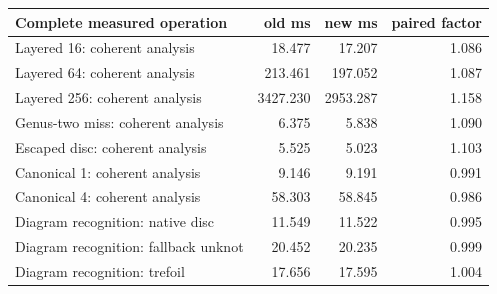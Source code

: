 \begin{center}
\small
\begin{tabular}{lrrr}
\toprule
Complete measured operation & old ms & new ms & paired factor\\
\midrule
Layered 16: coherent analysis & 18.477 & 17.207 & 1.086\\
Layered 64: coherent analysis & 213.461 & 197.052 & 1.087\\
Layered 256: coherent analysis & 3427.230 & 2953.287 & 1.158\\
Genus-two miss: coherent analysis & 6.375 & 5.838 & 1.090\\
Escaped disc: coherent analysis & 5.525 & 5.023 & 1.103\\
Canonical 1: coherent analysis & 9.146 & 9.191 & 0.991\\
Canonical 4: coherent analysis & 58.303 & 58.845 & 0.986\\
Diagram recognition: native disc & 11.549 & 11.522 & 0.995\\
Diagram recognition: fallback unknot & 20.452 & 20.235 & 0.999\\
Diagram recognition: trefoil & 17.656 & 17.595 & 1.004\\
\bottomrule
\end{tabular}
\end{center}
